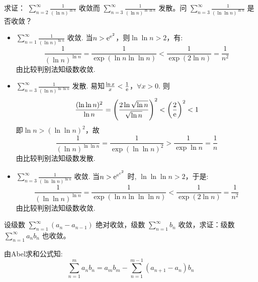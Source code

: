 \begin{problem}
    求证： \(\sum_{n=2}^{\infty} \frac{1}{(\ln n)^{\ln n}}\) 收敛而
    \(\sum_{n=3}^{\infty} \frac{1}{(\ln n)^{\ln \ln n}}\) 发散。问
    \(\sum_{n=3}^{\infty} \frac{1}{(\ln \ln n)^{\ln n}}\) 是否收敛？
\end{problem}

\begin{solution}
    \begin{itemize}
        \item \(\sum_{n=1}^{\infty} \frac{1}{(\ln n)^{\ln n}}\) 收敛.
            当\(n > \mathrm{e}^{\mathrm{e}^{2}}\)，则\(\ln \ln n > 2\)，有:
            \[
                \frac{1}{(\ln n)^{\ln n}} = \frac{1}{\exp(\ln n
                \ln\ln n)} < \frac{1}{\exp(2\ln n)} = \frac{1}{n^2}
            \]
            由比较判别法知级数收敛.
        \item \(\sum_{n=3}^{\infty} \frac{1}{(\ln n)^{\ln
            \ln n}}\) 发散.
            易知\(\frac{\ln x}{x} < \frac{1}{\mathrm{e}}\)，\(\forall x > 0\).
            则\[
                \frac{(\ln\ln n)^{2}}{\ln n} = \left( \frac{2\ln
                \sqrt{\ln n}}{\sqrt{\ln n}} \right)^{2} < \left(
                \frac{2}{\mathrm{e}} \right)^{2} < 1
            \]
            即\(\ln n > (\ln \ln n)^{2}\)，故\[
                \frac{1}{(\ln n)^{\ln \ln n}} = \frac{1}{\exp(\ln\ln
                n)^{2}} > \frac{1}{\exp \ln n} = \frac{1}{n}
            \]
            由比较判别法知级数发散.
        \item \(\sum_{n=3}^{\infty} \frac{1}{(\ln \ln
            n)^{\ln n}}\) 收敛.
            当\(n > \mathrm{e}^{\mathrm{e}^{\mathrm{e}^{2}}}\) 时,
            \(\ln\ln\ln n > 2\)，于是: \[
                \frac{1}{(\ln \ln n)^{\ln n}} = \frac{1}{\exp(\ln n
                \ln\ln\ln n)} < \frac{1}{\exp(2\ln n)} = \frac{1}{n^2}
            \]
            由比较判别法知级数收敛.
    \end{itemize}
\end{solution}
\setcounter{problems}{11}
\begin{problem}
    设级数 \(\sum_{n=1}^{\infty} (a_n - a_{n-1})\) 绝对收敛，级数
    \(\sum_{n=1}^{\infty} b_n\) 收敛，求证：级数
    \(\sum_{n=1}^{\infty} a_n b_n\) 也收敛。
\end{problem}

\begin{solution}
    由Abel求和公式知: \[
        \sum_{n=1}^{m} a_{n}b_{n} = a_{m}b_{m} - \sum_{n=1}^{m-1}
        (a_{n+1} - a_{n})b_{n}
    \]

\end{solution}
